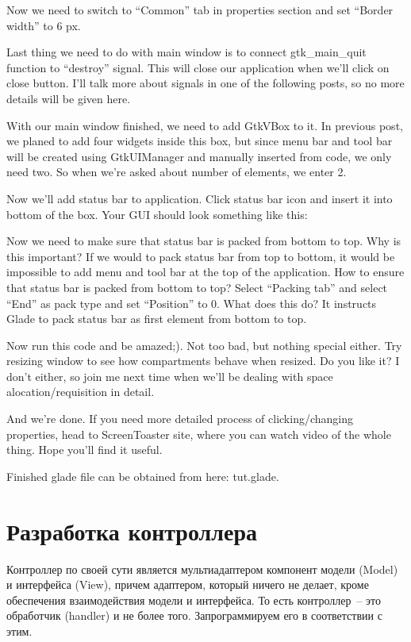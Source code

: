 \documentclass[a4paper,openany,twoside,final]{book}
\begin{document}
 Now we need to switch to ``Common'' tab in properties section and set ``Border width'' to 6 px.

Last thing we need to do with main window is to connect gtk\_main\_quit function to ``destroy'' signal. This will close our application when we'll click on close button. I'll talk more about signals in one of the following posts, so no more details will be given here.

With our main window finished, we need to add GtkVBox to it. In previous post, we planed to add four widgets inside this box, but since menu bar and tool bar will be created using GtkUIManager and manually inserted from code, we only need two. So when we're asked about number of elements, we enter 2.

Now we'll add status bar to application. Click status bar icon and insert it into bottom of the box. Your GUI should look something like this:

Now we need to make sure that status bar is packed from bottom to top. Why is this important? If we would to pack status bar from top to bottom, it would be impossible to add menu and tool bar at the top of the application. How to ensure that status bar is packed from bottom to top? Select ``Packing tab'' and select ``End'' as pack type and set ``Position'' to 0. What does this do? It instructs Glade to pack status bar as first element from bottom to top.

Now run this code and be amazed;). Not too bad, but nothing special either. Try resizing window to see how compartments behave when resized. Do you like it? I don't either, so join me next time when we'll be dealing with space alocation/requisition in detail.

And we're done. If you need more detailed process of clicking/changing properties, head to ScreenToaster site, where you can watch video of the whole thing. Hope you'll find it useful.

Finished glade file can be obtained from here: tut.glade.

\section{Разработка контроллера}
\label{sec:gtkcontroller}

Контроллер по своей сути является мультиадаптером компонент модели (Model) и интерфейса (View), причем адаптером, который ничего не делает, кроме обеспечения взаимодействия модели и интерфейса.  То есть контроллер~-- это обработчик (handler) и не более того.  Запрограммируем его в соответствии с этим.
\end{document}

